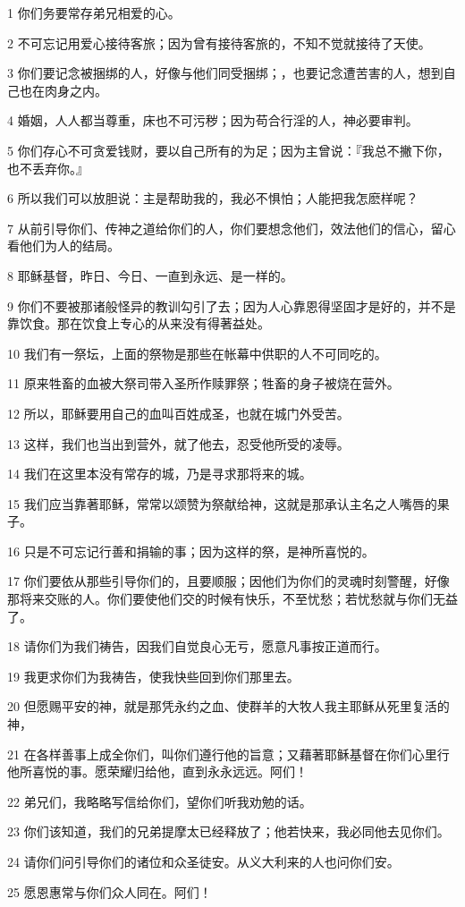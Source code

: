 \par 1 你们务要常存弟兄相爱的心。
\par 2 不可忘记用爱心接待客旅；因为曾有接待客旅的，不知不觉就接待了天使。
\par 3 你们要记念被捆绑的人，好像与他们同受捆绑；，也要记念遭苦害的人，想到自己也在肉身之内。
\par 4 婚姻，人人都当尊重，床也不可污秽；因为苟合行淫的人，神必要审判。
\par 5 你们存心不可贪爱钱财，要以自己所有的为足；因为主曾说：『我总不撇下你，也不丢弃你。』
\par 6 所以我们可以放胆说：主是帮助我的，我必不惧怕；人能把我怎麽样呢？
\par 7 从前引导你们、传神之道给你们的人，你们要想念他们，效法他们的信心，留心看他们为人的结局。
\par 8 耶稣基督，昨日、今日、一直到永远、是一样的。
\par 9 你们不要被那诸般怪异的教训勾引了去；因为人心靠恩得坚固才是好的，并不是靠饮食。那在饮食上专心的从来没有得著益处。
\par 10 我们有一祭坛，上面的祭物是那些在帐幕中供职的人不可同吃的。
\par 11 原来牲畜的血被大祭司带入圣所作赎罪祭；牲畜的身子被烧在营外。
\par 12 所以，耶稣要用自己的血叫百姓成圣，也就在城门外受苦。
\par 13 这样，我们也当出到营外，就了他去，忍受他所受的凌辱。
\par 14 我们在这里本没有常存的城，乃是寻求那将来的城。
\par 15 我们应当靠著耶稣，常常以颂赞为祭献给神，这就是那承认主名之人嘴唇的果子。
\par 16 只是不可忘记行善和捐输的事；因为这样的祭，是神所喜悦的。
\par 17 你们要依从那些引导你们的，且要顺服；因他们为你们的灵魂时刻警醒，好像那将来交账的人。你们要使他们交的时候有快乐，不至忧愁；若忧愁就与你们无益了。
\par 18 请你们为我们祷告，因我们自觉良心无亏，愿意凡事按正道而行。
\par 19 我更求你们为我祷告，使我快些回到你们那里去。
\par 20 但愿赐平安的神，就是那凭永约之血、使群羊的大牧人我主耶稣从死里复活的神，
\par 21 在各样善事上成全你们，叫你们遵行他的旨意；又藉著耶稣基督在你们心里行他所喜悦的事。愿荣耀归给他，直到永永远远。阿们！
\par 22 弟兄们，我略略写信给你们，望你们听我劝勉的话。
\par 23 你们该知道，我们的兄弟提摩太已经释放了；他若快来，我必同他去见你们。
\par 24 请你们问引导你们的诸位和众圣徒安。从义大利来的人也问你们安。
\par 25 愿恩惠常与你们众人同在。阿们！


